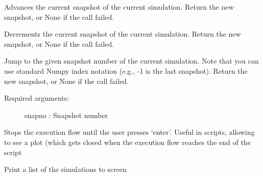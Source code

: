 \documentclass[letterpaper,10pt,english]{sphinxmanual}
\begin{document}
\begin{fulllineitems}
\label{index:facade.next}
Advances the current snapshot of the current simulation.
Return the new snapshot, or None if the call failed.

\end{fulllineitems}


\begin{fulllineitems}
\label{index:facade.previous}
Decrements the current snapshot of the current simulation.
Return the new snapshot, or None if the call failed.

\end{fulllineitems}


\begin{fulllineitems}
\label{index:facade.snap}
Jump to the given snapshot number of the current simulation.  Note that
you can use standard Numpy index notation (e.g., -1 is the last snapshot).
Return the new snapshot, or None if the call failed.
\begin{description}
\item[{Required arguments:}] \leavevmode
snapno     : Snapshot number

\end{description}

\end{fulllineitems}


\begin{fulllineitems}
\label{index:facade.block}
Stops the execution flow until the user presses `enter'.
Useful in scripts, allowing to see a plot (which gets closed
when the execution flow reaches the end of the script

\end{fulllineitems}


\begin{fulllineitems}
\label{index:facade.sims}
Print a list of the simulations to screen

\end{fulllineitems}
\end{document}
